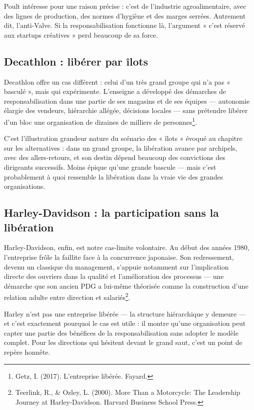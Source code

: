 Poult intéresse pour une raison précise : c'est de l'industrie agroalimentaire, avec des lignes de production, des normes d'hygiène et des marges serrées. Autrement dit, l'anti-Valve. Si la responsabilisation fonctionne là, l'argument « c'est réservé aux startups créatives » perd beaucoup de sa force.

\subsection{Decathlon : libérer par îlots}

Decathlon offre un cas différent : celui d'un très grand groupe qui n'a pas « basculé », mais qui expérimente. L'enseigne a développé des démarches de responsabilisation dans une partie de ses magasins et de ses équipes — autonomie élargie des vendeurs, hiérarchie allégée, décisions locales — sans prétendre libérer d'un bloc une organisation de dizaines de milliers de personnes\footnote{Getz, I. (2017). L'entreprise libérée. Fayard.}.

C'est l'illustration grandeur nature du scénario des « îlots » évoqué au chapitre sur les alternatives : dans un grand groupe, la libération avance par archipels, avec des allers-retours, et son destin dépend beaucoup des convictions des dirigeants successifs. Moins épique qu'une grande bascule — mais c'est probablement à quoi ressemble la libération dans la vraie vie des grandes organisations.

\subsection{Harley-Davidson : la participation sans la libération}

Harley-Davidson, enfin, est notre cas-limite volontaire. Au début des années 1980, l'entreprise frôle la faillite face à la concurrence japonaise. Son redressement, devenu un classique du management, s'appuie notamment sur l'implication directe des ouvriers dans la qualité et l'amélioration des processus — une démarche que son ancien PDG a lui-même théorisée comme la construction d'une relation adulte entre direction et salariés\footnote{Teerlink, R., \& Ozley, L. (2000). More Than a Motorcycle: The Leadership Journey at Harley-Davidson. Harvard Business School Press.}.

Harley n'est pas une entreprise libérée — la structure hiérarchique y demeure — et c'est exactement pourquoi le cas est utile : il montre qu'une organisation peut capter une partie des bénéfices de la responsabilisation sans adopter le modèle complet. Pour les directions qui hésitent devant le grand saut, c'est un point de repère honnête.

